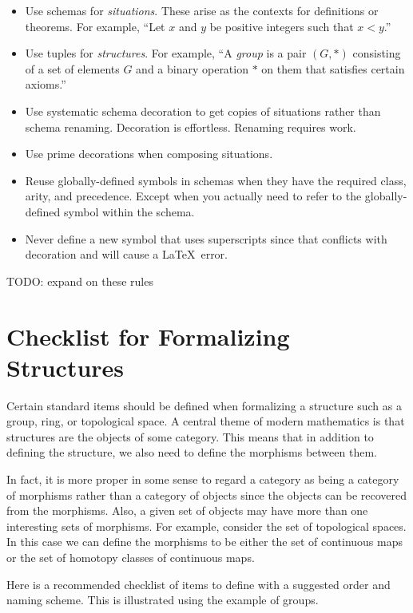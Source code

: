 \documentclass{amsart}
\begin{document}
\begin{itemize}
	\item Use schemas for \textit{situations}. These arise as the contexts for definitions or theorems.
	For example, ``Let $x$ and $y$ be positive integers such that $x < y$.''
	\item Use tuples for \textit{structures}. For example, ``A \textit{group} is a pair $(G, *)$ 
	consisting of a set of elements $G$
	and a binary operation $*$ on them that satisfies certain axioms.''
	\item Use systematic schema decoration to get copies of situations rather than schema renaming.
	Decoration is effortless. Renaming requires work.
	\item Use prime decorations when composing situations.
	\item Reuse globally-defined symbols in schemas when they have the required class, arity, and precedence.
	Except when you actually need to refer to the globally-defined symbol within the schema.
	\item Never define a new symbol that uses superscripts since that conflicts with decoration and will cause
	a \LaTeX\ error.
\end{itemize}

TODO: expand on these rules

\section{Checklist for Formalizing Structures}

Certain standard items should be defined when formalizing a structure such as a group, ring, or topological space.
A central theme of modern mathematics is that structures are the objects of some category.
This means that in addition to defining the structure, we also need to define the morphisms
between them. 

In fact, it is more proper in some sense to regard a category as being a category of morphisms
rather than a category of objects since the objects can be recovered from the morphisms.
Also, a given set of objects may have more than one interesting sets of morphisms.
For example, consider the set of topological spaces. 
In this case we can define the morphisms to be either the set of continuous maps or the set of homotopy classes
of continuous maps.

Here is a recommended checklist of items to define with a suggested order and naming scheme.
This is illustrated using the example of groups.
\end{document}
